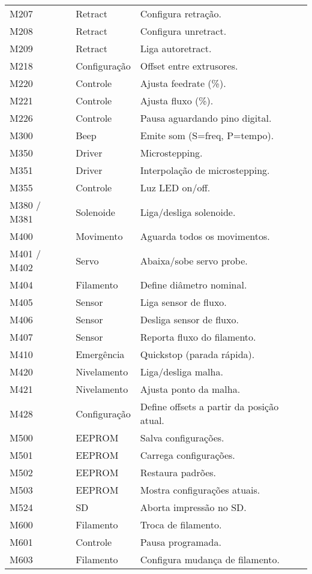 \begin{longtable}{|l|l|p{\funcwidth}|}
			M207 & Retract & Configura retração. \\
			M208 & Retract & Configura unretract. \\
			M209 & Retract & Liga autoretract. \\
			M218 & Configuração & Offset entre extrusores. \\
			M220 & Controle & Ajusta feedrate (\%). \\
			M221 & Controle & Ajusta fluxo (\%). \\
			M226 & Controle & Pausa aguardando pino digital. \\
			M300 & Beep & Emite som (S=freq, P=tempo). \\
			M350 & Driver & Microstepping. \\
			M351 & Driver & Interpolação de microstepping. \\
			M355 & Controle & Luz LED on/off. \\
			M380 / M381 & Solenoide & Liga/desliga solenoide. \\
			M400 & Movimento & Aguarda todos os movimentos. \\
			M401 / M402 & Servo & Abaixa/sobe servo probe. \\
			M404 & Filamento & Define diâmetro nominal. \\
			M405 & Sensor & Liga sensor de fluxo. \\
			M406 & Sensor & Desliga sensor de fluxo. \\
			M407 & Sensor & Reporta fluxo do filamento. \\
			M410 & Emergência & Quickstop (parada rápida). \\
			M420 & Nivelamento & Liga/desliga malha. \\
			M421 & Nivelamento & Ajusta ponto da malha. \\
			M428 & Configuração & Define offsets a partir da posição atual. \\
			M500 & EEPROM & Salva configurações. \\
			M501 & EEPROM & Carrega configurações. \\
			M502 & EEPROM & Restaura padrões. \\
			M503 & EEPROM & Mostra configurações atuais. \\
			M524 & SD & Aborta impressão no SD. \\
			M600 & Filamento & Troca de filamento. \\
			M601 & Controle & Pausa programada. \\
			M603 & Filamento & Configura mudança de filamento. \\

\end{longtable}
